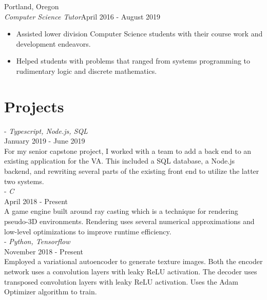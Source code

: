 \documentclass[12pt]{article}
\begin{document}
	\hfill Portland, Oregon\\
	\noindent\emph{Computer Science Tutor}\hfill April 2016 - August 2019
	\begin{itemize}[noitemsep]
		\item Assisted lower division Computer Science students with their course work and development endeavors.
		\item  Helped students with problems that ranged from systems programming to rudimentary logic and discrete mathematics.
	\end{itemize}


	\section*{Projects}
	 - \emph{Typescript, Node.js, SQL} \\
	\noindent January 2019 - June 2019 \\
	\noindent For my senior capstone project, I worked with a team to add a back end to an existing application for the VA.
	This included a SQL database, a Node.js backend, and rewriting several parts of the existing front end to utilize the latter two systems.
	\noindent \\

	\newpage
	 - \emph{C} \\
	\noindent April 2018 - Present \\
	\noindent A game engine built around ray casting which is a technique for rendering pseudo-3D environments. Rendering uses several numerical 
	approximations and low-level optimizations to improve runtime efficiency.\\

	 - \emph{Python, Tensorflow} \\
	\noindent November 2018 - Present\\
	\noindent Employed a variational autoencoder to generate texture images. Both the encoder network uses a convolution layers with leaky ReLU activation.
	The decoder uses transposed convolution layers with leaky ReLU activation. Uses the Adam Optimizer algorithm to train.
	\noindent \\

	

\end{document}
